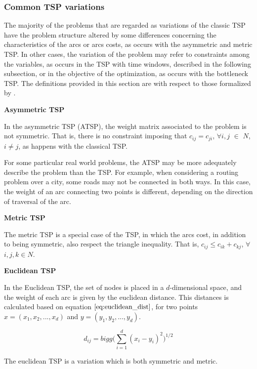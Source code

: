 \subsubsection{Common TSP variations}
\label{sec:tsp_variations}

The majority of the problems that are regarded as variations of the classic TSP have the problem structure altered by some differences concerning the characteristics of the arcs or arcs costs, as occurs with the asymmetric and metric TSP. In other cases, the variation of the problem may refer to constraints among the variables, as occurs in the TSP with time windows, described in the following subsection, or in the objective of the optimization, as occurs with the bottleneck TSP. The definitions provided in this section are with respect to those formalized by \cite{tsp_book}.


\textbf{Asymmetric TSP}

In the asymmetric TSP (ATSP), the weight matrix associated to the problem is not symmetric. That is, there is no constraint imposing that $c_{ij} = c_{ji}$, $\forall i, j$ $\in$ $N$, $i \ne j$, as happens with the classical TSP.

For some particular real world problems, the ATSP may be more adequately describe the problem than the TSP. For example, when considering a routing problem over a city, some roads may not be connected in both ways. In this case, the weight of an arc connecting two points is different, depending on the direction of traversal of the arc.


\textbf{Metric TSP}

The metric TSP is a special case of the TSP, in which the arcs cost,
in addition to being symmetric, also respect the triangle inequality. That is,
$c_{ij} \leq c_{ik} + c_{kj}$, $\forall$ $i, j, k \in N$.


\textbf{Euclidean TSP}

In the Euclidean TSP, the set of nodes is placed in a $d$-dimensional space,
and the weight of each arc is given by the euclidean distance. This distances is
calculated based on equation $\ref{eq:euclidean_dist}$, for two points
$x = (x_{1}, x_{2}, ..., x_{d})$ and $y = (y_{1}, y_{2}, ..., y_{d})$.

\begin{equation}
\label{eq:euclidean_dist}
  d_{ij} = bigg( \sum_{i=1}^{d} (x_{i}-y_{i})^2\bigg)^{1/2}
\end{equation}

The euclidean TSP is a variation which is both symmetric and metric.


